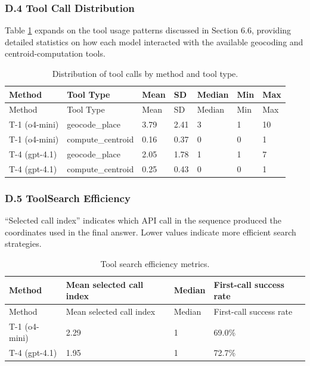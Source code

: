 \documentclass[
  10pt,
  twocolumn]{article}
\begin{document}
\subsubsection{D.4 Tool Call
Distribution}\label{d.4-tool-call-distribution}

Table \ref{tbl:tool_distribution} expands on the tool usage patterns
discussed in Section 6.6, providing detailed statistics on how each
model interacted with the available geocoding and centroid-computation
tools.

\begin{longtable}[]{@{}lllllll@{}}
\caption{\label{tbl:tool_distribution}Distribution of tool calls by
method and tool type.}\tabularnewline
\toprule\noalign{}
Method & Tool Type & Mean & SD & Median & Min & Max \\
\midrule\noalign{}
\endfirsthead
\toprule\noalign{}
Method & Tool Type & Mean & SD & Median & Min & Max \\
\midrule\noalign{}
\endhead
\bottomrule\noalign{}
\endlastfoot
T-1 (o4-mini) & geocode\_place & 3.79 & 2.41 & 3 & 1 & 10 \\
T-1 (o4-mini) & compute\_centroid & 0.16 & 0.37 & 0 & 0 & 1 \\
T-4 (gpt-4.1) & geocode\_place & 2.05 & 1.78 & 1 & 1 & 7 \\
T-4 (gpt-4.1) & compute\_centroid & 0.25 & 0.43 & 0 & 0 & 1 \\
\end{longtable}

\subsubsection{D.5 ToolSearch
Efficiency}\label{d.5-toolsearch-efficiency}

``Selected call index'' indicates which API call in the sequence
produced the coordinates used in the final answer. Lower values indicate
more efficient search strategies.

\begin{longtable}[]{@{}llll@{}}
\caption{\label{tbl:search_efficiency}Tool search efficiency
metrics.}\tabularnewline
\toprule\noalign{}
Method & Mean selected call index & Median & First-call success rate \\
\midrule\noalign{}
\endfirsthead
\toprule\noalign{}
Method & Mean selected call index & Median & First-call success rate \\
\midrule\noalign{}
\endhead
\bottomrule\noalign{}
\endlastfoot
T-1 (o4-mini) & 2.29 & 1 & 69.0\% \\
T-4 (gpt-4.1) & 1.95 & 1 & 72.7\% \\
\end{longtable}
\end{document}
